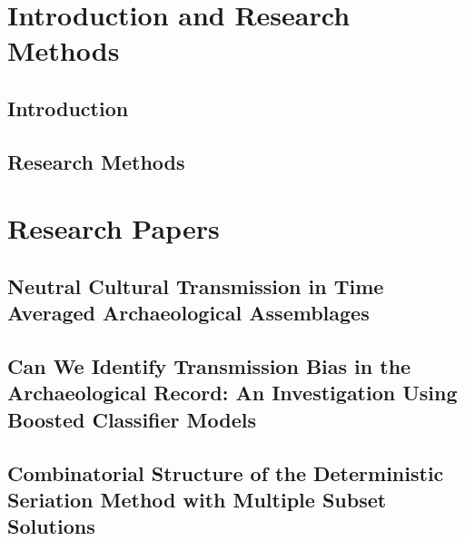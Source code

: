 \documentclass[letterpaper,12pt,final,openright,twoside]{memoir}
\date{\yearonly\today}
\begin{document}

\frontmatter %
\small




\mainmatter %
\normalsize
\acresetall    %

\DoubleSpacing

\part{Introduction and Research Methods}
\label{part:intro}

    \chapter{Introduction}
    \label{chap:intro}
    
    
    \chapter{Research Methods}
    \label{chap:methods}
    

\part{Research Papers}
\label{part:papers}

    \chapter{Neutral Cultural Transmission in Time Averaged Archaeological Assemblages}
    \label{chap:timeaveraging-paper}
    
    
    \chapter{Can We Identify Transmission Bias in the Archaeological Record:  An Investigation Using Boosted Classifier Models}
    \label{chap:ctmixtures-paper}
    
    
    \chapter{Combinatorial Structure of the Deterministic Seriation Method with Multiple Subset Solutions}
    \label{chap:seriationcombinatorics-paper}
    
    
\end{document}
